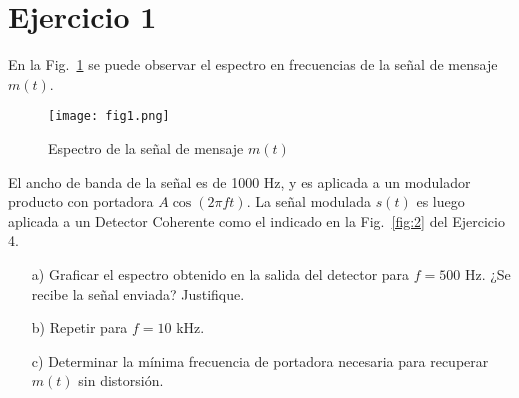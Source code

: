\section{Ejercicio 1}  
En la Fig.~\ref{fig:1} se puede observar el espectro en frecuencias de la señal de mensaje $m(t)$.  

\begin{figure}[h!]
    \centering
    \texttt{[image: fig1.png]}
    \caption{Espectro de la señal de mensaje $m(t)$}
    \label{fig:1}
\end{figure}

El ancho de banda de la señal es de 1000 Hz, y es aplicada a un modulador producto con portadora $A\cos(2\pi f t)$. La señal modulada $s(t)$ es luego aplicada a un Detector Coherente como el indicado en la Fig.~\ref{fig:2} del Ejercicio 4.  

\begin{itemize}
    \item[a)] Graficar el espectro obtenido en la salida del detector para $f=500$ Hz. ¿Se recibe la señal enviada? Justifique.  
    \item[b)] Repetir para $f=10$ kHz.  
    \item[c)] Determinar la mínima frecuencia de portadora necesaria para recuperar $m(t)$ sin distorsión.  
\end{itemize}